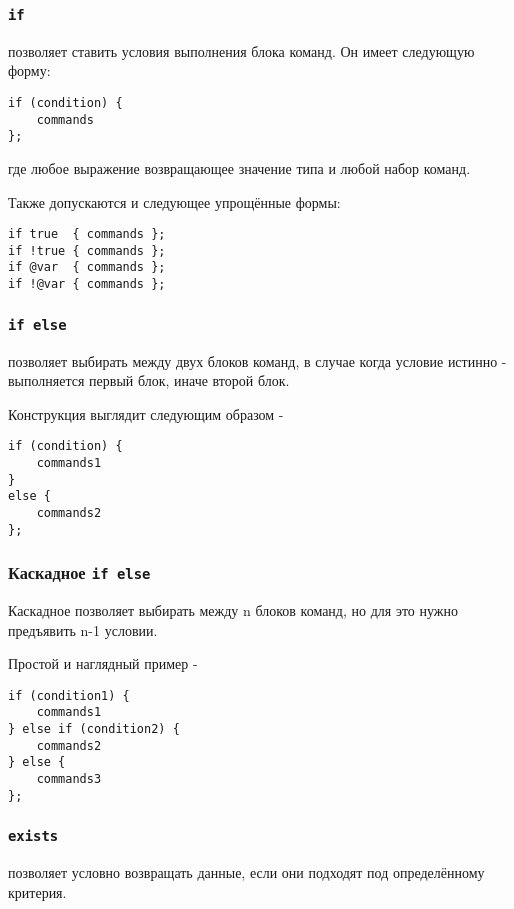 \documentclass[a4paper, 14pt]{extarticle}
\begin{document}
\subsubsection{\lstinline`if`}

 позволяет ставить условия выполнения блока команд. Он имеет следующую форму:
\begin{lstlisting}[numbers=none]
if (condition) {
	commands
};
\end{lstlisting}
где  любое выражение возвращающее значение типа  и  любой набор команд.

Также допускаются и следующее упрощённые формы:
\begin{lstlisting}[numbers=none]
if true  { commands };
if !true { commands };
if @var  { commands };
if !@var { commands };
\end{lstlisting}

\subsubsection{\lstinline`if else`}

 позволяет выбирать между двух блоков команд, в случае когда условие истинно - выполняется первый блок, иначе второй блок.
	
\noindent Конструкция  выглядит следующим образом -
\begin{lstlisting}[numbers=none]
if (condition) {
	commands1
}
else {
	commands2
};
\end{lstlisting}

\subsubsection{Каскадное \lstinline`if else`}

Каскадное  позволяет выбирать между n блоков команд, но для это нужно предъявить n-1 условии.
	
\noindent Простой и наглядный пример -
\begin{lstlisting}[numbers=none]
if (condition1) {
	commands1
} else if (condition2) {
	commands2
} else {
	commands3
};
\end{lstlisting}

\subsubsection{\lstinline`exists`}

 позволяет условно возвращать данные, если они подходят под определённому критерия.
	
\end{document}
